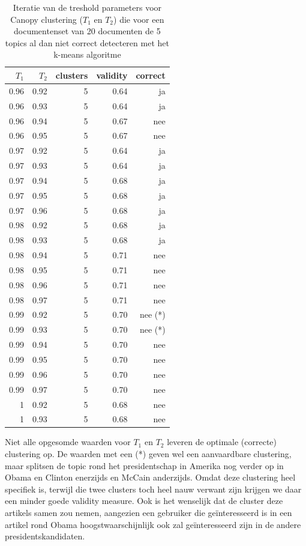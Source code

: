 \begin{table}[htbp] 
\centering 
\caption{Iteratie van de treshold parameters voor Canopy clustering ($T_1$ en $T_2$) die voor een documentenset van 20 documenten de 5 topics al dan niet correct detecteren met het k-means algoritme} 
\begin{tabular}{rrrrr} 
 \toprule $T_1$ & $T_2$ & clusters & validity & correct \\ \midrule 0.96 & 0.92 & 5 & 0.64 & ja \\ 0.96 & 0.93 & 5 & 0.64 & ja \\ 0.96 & 0.94 & 5 & 0.67 & nee \\ 0.96 & 0.95 & 5 & 0.67 & nee \\ 0.97 & 0.92 & 5 & 0.64 & ja \\ 0.97 & 0.93 & 5 & 0.64 & ja \\ 0.97 & 0.94 & 5 & 0.68 & ja \\ 0.97 & 0.95 & 5 & 0.68 & ja \\ 0.97 & 0.96 & 5 & 0.68 & ja \\ 0.98 & 0.92 & 5 & 0.68 & ja \\ 0.98 & 0.93 & 5 & 0.68 & ja \\ 0.98 & 0.94 & 5 & 0.71 & nee \\ 0.98 & 0.95 & 5 & 0.71 & nee \\ 0.98 & 0.96 & 5 & 0.71 & nee \\ 0.98 & 0.97 & 5 & 0.71 & nee \\ 0.99 & 0.92 & 5 & 0.70 & nee (*) \\ 0.99 & 0.93 & 5 & 0.70 & nee (*) \\ 0.99 & 0.94 & 5 & 0.70 & nee \\ 0.99 & 0.95 & 5 & 0.70 & nee \\ 0.99 & 0.96 & 5 & 0.70 & nee \\ 0.99 & 0.97 & 5 & 0.70 & nee \\ 1 & 0.92 & 5 & 0.68 & nee \\ 1 & 0.93 & 5 & 0.68 & nee \\ \bottomrule
\end{tabular}%
\label{tab:canopy}%
\end{table}%

Niet alle opgesomde waarden voor $T_1$ en $T_2$ leveren de optimale (correcte) clustering op. De waarden met een (*) geven wel een aanvaardbare clustering, maar splitsen de topic rond het presidentschap in Amerika nog verder op in Obama en Clinton enerzijds en McCain anderzijds. Omdat deze clustering heel specifiek is, terwijl die twee clusters toch heel nauw verwant zijn krijgen we daar een minder goede validity measure. Ook is het wenselijk dat de cluster deze artikels samen zou nemen, aangezien een gebruiker die ge\"interesseerd is in een artikel rond Obama hoogstwaarschijnlijk ook zal ge\"interesseerd zijn in de andere presidentskandidaten. 


